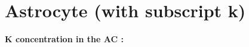 \documentclass[fleqn]{report}
\numberwithin{equation}{section}
\numberwithin{equation}{section}
\newcommand{\NO}{\text{NO}}
\newcommand{\Otwo}{\text{O$_2$}}
\newcommand{\NOk}{\text{[NO]$_k$}}
\newcommand{\uMpers}{\textmu M\,s$^{-1}$}
\newcommand\e[1]{$\times$10$^{#1}$}
\newcommand{\n}{$^{-1}$}
\newcommand\pNO[1]{\text{$p_{\text{NO},#1}$}}
\newcommand\cNO[1]{\text{$c_{\text{NO},#1}$}}
\newcommand\dNO[1]{\text{$d_{\text{NO},#1}$}}
\begin{document}
	\section{Astrocyte (with subscript k)}
%	
%			
%					
%					
%				
%				
	\textbf{\gls{K} concentration in the AC  :}
\end{document}
